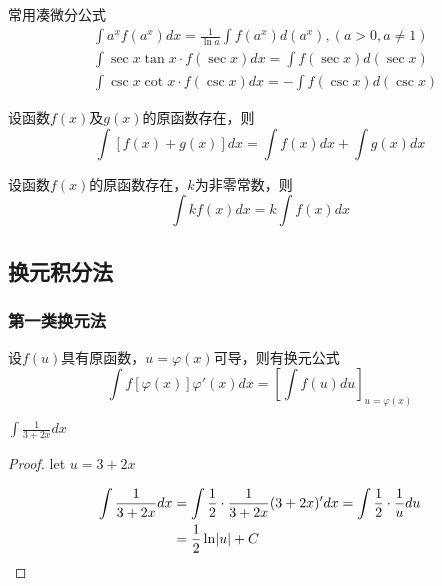\documentclass[11pt]{article}
\begin{document}
常用凑微分公式
\begin{align*}
&\int a^xf(a^x)dx=\frac{1}{\ln a}\int f(a^x)d(a^x),(a>0,a\neq1)\\
&\int\sec x\tan x\cdot f(\sec x)dx=\int f(\sec x)d(\sec x)\\
&\int\csc x\cot x\cdot f(\csc x)dx=-\int f(\csc x)d(\csc x)
\end{align*}

\begin{proposition}[]
设函数\(f(x)\)及\(g(x)\)的原函数存在，则
\begin{equation*}
\int[f(x)+g(x)]dx=\int f(x)dx+\int g(x)dx
\end{equation*}
\end{proposition}

\begin{proposition}[]
设函数\(f(x)\)的原函数存在，\(k\)为非零常数，则
\begin{equation*}
\int kf(x)dx=k\int f(x)dx
\end{equation*}
\end{proposition}
\subsection{换元积分法}
\label{sec:org5970dc5}
\subsubsection{第一类换元法}
\label{sec:org2dcbd9f}
\begin{theorem}[]
设\(f(u)\)具有原函数，\(u=\varphi(x)\)可导，则有换元公式
\begin{equation*}
\int f[\varphi(x)]\varphi'(x)dx=\left[\int f(u)du\right]_{u=\varphi(x)}
\end{equation*}
\end{theorem}

\begin{proposition}[]
\(\int\frac{1}{3+2x}dx\)
\end{proposition}

\begin{proof}
let \(u=3+2x\)

\begin{align*}
\int\frac{1}{3+2x}dx&=\int\frac{1}{2}\cdot\frac{1}{3+2x}(3+2x)'dx=\int\frac{1}{2}\cdot\frac{1}{u}du\\
&=\frac{1}{2}\ln\abs{u}+C
\end{align*}
\end{proof}
\end{document}
